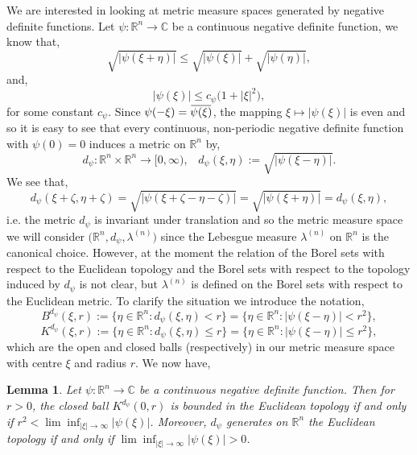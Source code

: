 \documentclass[a4paper, 12pt]{report}
\newtheorem{lemma}[theorem]{Lemma}
\theoremstyle{cor}
\theoremstyle{remark}
\theoremstyle{definition}
\newcommand{\overbar}[1]{\mkern 1.5mu\overline{\mkern-1.5mu#1\mkern-1.5mu}\mkern 1.5mu}
\begin{document}
We are interested in looking at metric measure spaces generated by negative definite functions.  Let $\psi : \mathbb{R}^n \to \mathbb{C}$ be a continuous negative definite function, we know that,
$$
\sqrt{|\psi(\xi + \eta)|} \le \sqrt{|\psi(\xi)|} + \sqrt{|\psi(\eta)|},
$$
and,
$$
|\psi(\xi)| \le c_\psi\big(1 + |\xi|^2\big),
$$
for some constant $c_\psi$.  Since $\psi(-\xi) = \overbar{\psi(\xi)}$, the mapping $\xi \mapsto |\psi(\xi)|$ is even and so it is easy to see that every continuous, non-periodic negative definite function with $\psi(0) = 0$ induces a metric on $\mathbb{R}^n$ by,
$$
d_\psi : \mathbb{R}^n \times \mathbb{R}^n \to [0, \infty), \,\,\,\,\, d_\psi(\xi, \eta) := \sqrt{|\psi(\xi - \eta)|}.
$$
We see that,
$$
d_\psi(\xi + \zeta, \eta + \zeta) = \sqrt{|\psi(\xi + \zeta - \eta - \zeta)|} = \sqrt{|\psi(\xi + \eta)|} = d_\psi(\xi, \eta),
$$
i.e. the metric $d_\psi$ is invariant under translation and so the metric measure space we will consider $\big(\mathbb{R}^n, d_\psi, \lambda^{(n)}\big)$ since the Lebesgue measure $\lambda^{(n)}$ on $\mathbb{R}^n$ is the canonical choice.  However, at the moment the relation of the Borel sets with respect to the Euclidean topology and the Borel sets with respect to the topology induced by $d_\psi$ is not clear, but $\lambda^{(n)}$ is defined on the Borel sets with respect to the Euclidean metric.  To clarify the situation we introduce the notation,
$$
B^{d_\psi}(\xi, r) := \{\eta \in \mathbb{R}^n : d_\psi(\xi, \eta) < r\} = \{\eta \in \mathbb{R}^n : |\psi(\xi - \eta)| < r^2\},
$$
$$
K^{d_\psi}(\xi, r) := \{\eta \in \mathbb{R}^n : d_\psi(\xi, \eta) \le r\} = \{\eta \in \mathbb{R}^n : |\psi(\xi - \eta)| \le r^2\},
$$
which are the open and closed balls (respectively) in our metric measure space with centre $\xi$ and radius $r$.  We now have,
\begin{lemma}
Let $\psi : \mathbb{R}^n \to \mathbb{C}$ be a continuous negative definite function.  Then for $r > 0$, the closed ball $K^{d_\psi}(0, r)$ is bounded in the Euclidean topology if and only if $r^2 < \lim\inf_{|\xi| \to \infty}|\psi(\xi)|$.  Moreover, $d_\psi$ generates on $\mathbb{R}^n$ the Euclidean topology if and only if $\lim\inf_{|\xi| \to \infty}|\psi(\xi)| > 0$.
\end{lemma}
\end{document}
